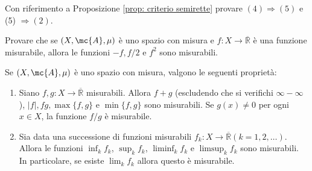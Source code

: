 \begin{exc}Con riferimento a Proposizione \ref{prop: criterio semirette} provare $(4) \Rightarrow(5)$ e (5) $\Rightarrow(2)$.
\end{exc}

\begin{exc}\label{exc: 2.3} Provare che se $(X, \mc{A}, \mu)$ è uno spazio con misura e $f: X \rightarrow \overline{\mathbb{R}}$ è una funzione misurabile, allora le funzioni $-f, f / 2$ e $f^{2}$ sono misurabili. \end{exc}

\begin{shadedTheorem}[$**$| Chiusura]\label{thm: chiusura}
   Se $(X, \mc{A}, \mu)$ è uno spazio con misura, valgono le seguenti proprietà:
        \begin{enumerate}
          \item Siano $f, g: X \rightarrow \overline{\mathbb{R}}$ misurabili. Allora $f+g$ (escludendo che si verifichi $\infty-\infty$ ), $|f|, f g, \max \{f, g\}$ e $\min \{f, g\}$ sono misurabili. Se $g(x) \neq 0$ per ogni $x \in X$, la funzione ${f} /{g}$ è misurabile.
          \item Sia data una successione di funzioni misurabili $f_{k}: X \rightarrow \overline{\mathbb{R}}(k=1,2, \ldots)$. Allora le funzioni $\inf _{k} f_{k}$, $\sup _{k} f_{k}$, $\liminf _{k} f_{k}$ e $\limsup _{k} f_{k}$ sono misurabili. In particolare, se esiste $\lim _{k} f_{k}$ allora questo è misurabile.
        \end{enumerate}
\end{shadedTheorem}

